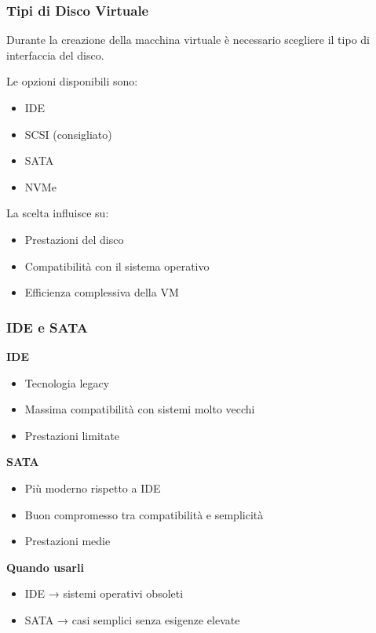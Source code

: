 \documentclass{beamer}
\begin{document}
	\begin{frame}
		\frametitle{Tipi di Disco Virtuale}
		
		Durante la creazione della macchina virtuale è necessario scegliere
		il tipo di interfaccia del disco.
		
		\vspace{0.5cm}
		
		Le opzioni disponibili sono:
		
		\begin{itemize}
			\item IDE
			\item SCSI (consigliato)
			\item SATA
			\item NVMe
		\end{itemize}
		
		\vspace{0.5cm}
		
		La scelta influisce su:
		\begin{itemize}
			\item Prestazioni del disco
			\item Compatibilità con il sistema operativo
			\item Efficienza complessiva della VM
		\end{itemize}
		
	\end{frame}
	
	
	\begin{frame}
		\frametitle{IDE e SATA}
		
		\textbf{IDE}
		\begin{itemize}
			\item Tecnologia legacy
			\item Massima compatibilità con sistemi molto vecchi
			\item Prestazioni limitate
		\end{itemize}
		
		\vspace{0.4cm}
		
		\textbf{SATA}
		\begin{itemize}
			\item Più moderno rispetto a IDE
			\item Buon compromesso tra compatibilità e semplicità
			\item Prestazioni medie
		\end{itemize}
		
		\vspace{0.4cm}
		
		\textbf{Quando usarli}
		\begin{itemize}
			\item IDE → sistemi operativi obsoleti
			\item SATA → casi semplici senza esigenze elevate
		\end{itemize}
		
	\end{frame}
	
\end{document}

